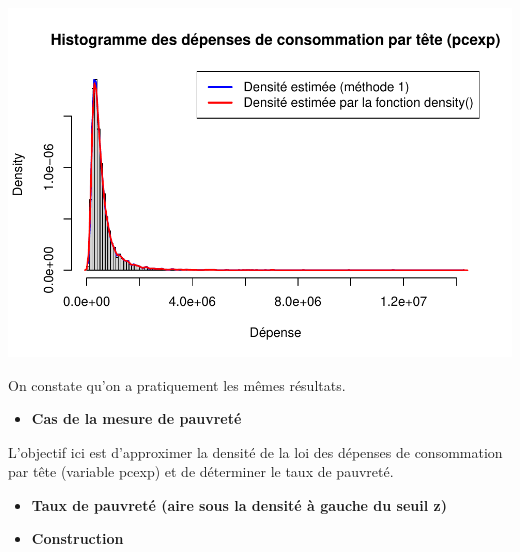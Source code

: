 \documentclass[
  12pt,
]{article}
\newenvironment{Shaded}{\begin{snugshade}}{\end{snugshade}}
\newcommand{\ControlFlowTok}[1]{\textcolor[rgb]{0.13,0.29,0.53}{\textbf{#1}}}
\newcommand{\FunctionTok}[1]{\textcolor[rgb]{0.13,0.29,0.53}{\textbf{#1}}}
\newcommand{\NormalTok}[1]{#1}
\newcommand{\OtherTok}[1]{\textcolor[rgb]{0.56,0.35,0.01}{#1}}
\newcommand{\SpecialCharTok}[1]{\textcolor[rgb]{0.81,0.36,0.00}{\textbf{#1}}}
\providecommand{\tightlist}{%
  \setlength{\itemsep}{0pt}\setlength{\parskip}{0pt}}
\begin{document}
\includegraphics{Stat_non_para_files/figure-latex/unnamed-chunk-177-1.pdf}

On constate qu'on a pratiquement les mêmes résultats.

\begin{itemize}
\tightlist
\item
  \textbf{Cas de la mesure de pauvreté}
\end{itemize}

L'objectif ici est d'approximer la densité de la loi des dépenses de
consommation par tête (variable pcexp) et de déterminer le taux de
pauvreté.

\begin{itemize}
\tightlist
\item
  \textbf{Taux de pauvreté (aire sous la densité à gauche du seuil z)}
\end{itemize}

\begin{Shaded}
\end{Shaded}

\begin{itemize}
\tightlist
\item
  \textbf{Construction}
\end{itemize}
\end{document}
